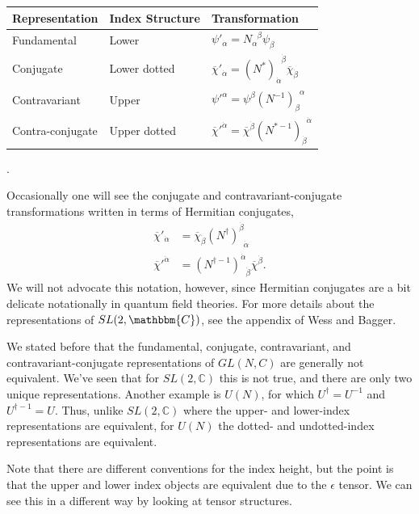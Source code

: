 \documentclass[12pt, oneside]{report}    %
\begin{document}
\begin{center}
    \begin{tabular}{|lll|}
        \hline
        \textbf{Representation} & \textbf{Index Structure} & \textbf{Transformation}\\
        \hline
        Fundamental & Lower & $\psi'_\alpha = N_\alpha^{\phantom\alpha\beta}\psi_\beta$\\
        Conjugate & Lower dotted & $\overline\chi'_{\dot\alpha} = (N^*)_{\dot\alpha}^{\phantom\alpha\dot\beta}\overline\chi_{\dot\beta}$\\
        Contravariant & Upper & $   \psi'^\alpha = \psi^\beta(N^{-1})_\beta^{\phantom\beta\alpha}$\\
        Contra-conjugate & Upper dotted & $\overline\chi'^{\dot\alpha} = \overline\chi^{\dot\beta}(N^{*-1})_{\dot\beta}^{\phantom\beta\dot\alpha}$\\
        \hline
    \end{tabular}.  
\end{center}
Occasionally one will see the conjugate and contravariant-conjugate transformations written in terms of Hermitian conjugates,
\begin{align}
    \overline\chi'_{\dot\alpha} &= \overline\chi_{\dot\beta}(N^\dag)_{\phantom\beta\dot\alpha}^{\dot\beta}\label{eq:SUSYalg:reps:2p}\\
    \overline\chi'^{\dot\alpha} &= (N^{\dag-1})_{\phantom\alpha\dot\beta}^{\dot\alpha}\overline\chi^{\dot\beta}.\label{eq:SUSYalg:reps:4p}
\end{align}
We will not advocate this notation, however, since Hermitian conjugates are a bit delicate notationally in quantum field theories. For more details about the representations of $SL(2,\mathbbm{C})$, see the appendix of Wess and Bagger\autocite{Wess:1992cp}.
\begin{example}
We stated before that the fundamental, conjugate, contravariant, and contravariant-conjugate representations of $GL(N,C)$ are generally not equivalent. We've seen that for $SL(2,\mathbb{C})$ this is not true, and there are only two unique representations. Another example is $U(N)$, for which $U^\dag = U^{-1}$ and $U^{\dag-1} = U$. Thus, unlike $SL(2,\mathbb{C})$ where the upper- and lower-index representations are equivalent, for $U(N)$ the dotted- and undotted-index representations are equivalent.
\end{example}
Note that there are different conventions for the index height, but the point is that the upper and lower index objects are equivalent due to the $\epsilon$ tensor. We can see this in a different way by looking at tensor structures. %
\end{document}
